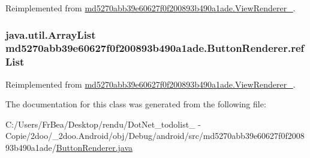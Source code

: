 Reimplemented from \hyperlink{classmd5270abb39e60627f0f200893b490a1ade_1_1_view_renderer__2_c66b6f41d2afba0df6ae890c8f2b644b}{md5270abb39e60627f0f200893b490a1ade.ViewRenderer\_}.\hypertarget{classmd5270abb39e60627f0f200893b490a1ade_1_1_button_renderer_2a4a0404703b01e8d3b5f88cd8313a90}{
\subsubsection[{refList}]{\setlength{\rightskip}{0pt plus 5cm}java.util.ArrayList {\bf md5270abb39e60627f0f200893b490a1ade.ButtonRenderer.refList}}}
\label{classmd5270abb39e60627f0f200893b490a1ade_1_1_button_renderer_2a4a0404703b01e8d3b5f88cd8313a90}




Reimplemented from \hyperlink{classmd5270abb39e60627f0f200893b490a1ade_1_1_view_renderer__2_489e61f24650a22849fddacb3f498a6b}{md5270abb39e60627f0f200893b490a1ade.ViewRenderer\_}.

The documentation for this class was generated from the following file:\begin{CompactItemize}
\item 
C:/Users/FrBea/Desktop/rendu/DotNet\_\-todolist\_ - Copie/2doo/\_\-2doo.Android/obj/Debug/android/src/md5270abb39e60627f0f200893b490a1ade/\hyperlink{md5270abb39e60627f0f200893b490a1ade_2_button_renderer_8java}{ButtonRenderer.java}\end{CompactItemize}
